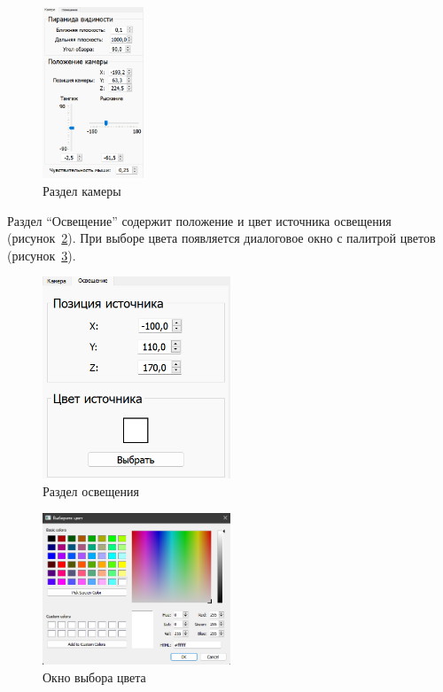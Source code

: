 \begin{figure}[h]
	\centering
	\includegraphics[width=0.27\textwidth]{img/examples/camera.png}
	\caption{Раздел камеры}
	\label{fig:camera}
\end{figure}

Раздел “Освещение” содержит положение и цвет источника освещения (рисунок~\ref{fig:light}). 
При выборе цвета появляется диалоговое окно с палитрой цветов (рисунок~\ref{fig:сhoose-color}).

\begin{figure}[h]
	\centering
	\includegraphics[width=0.5\textwidth]{img/examples/light.png}
	\caption{Раздел освещения}
	\label{fig:light}
\end{figure}

\begin{figure}[h]
	\centering
	\includegraphics[width=0.5\textwidth]{img/examples/choose-color.png}
	\caption{Окно выбора цвета}
	\label{fig:сhoose-color}
\end{figure}

